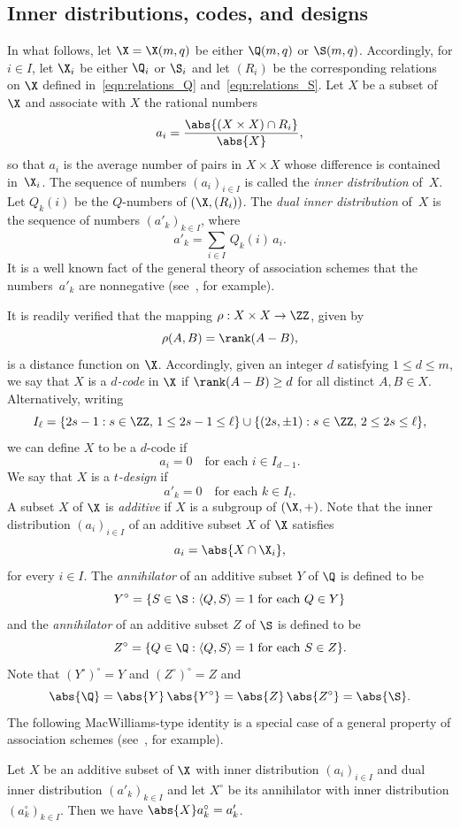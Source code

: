 \subsection{Inner distributions, codes, and designs}

In what follows, let $\X=\X(m,q)$ be either $\Q(m,q)$ or $\S(m,q)$. Accordingly, for $i\in I$, let $\X_i$ be either $\Q_i$ or $\S_i$  and let $(R_i)$ be the corresponding relations on $\X$ defined in~\eqref{eqn:relations_Q} and~\eqref{eqn:relations_S}. Let $X$ be a subset of $\X$ and associate with $X$ the rational numbers 
\[
a_i=\frac{\abs{(X\times X)\cap R_i}}{\abs{X}},
\]
so that $a_i$ is the average number of pairs in $X\times X$ whose difference is contained in~$\X_i$. The sequence of numbers $(a_i)_{i\in I}$ is called the \emph{inner distribution} of~$X$. Let $Q_k(i)$ be the $Q$-numbers of $(\X,(R_i))$. The \emph{dual inner distribution} of~$X$ is the sequence of numbers $(a'_k)_{k\in I}$, where
\begin{equation}
a'_k=\sum_{i\in I}\,Q_k(i)\,a_i.   \label{eqn:def_dual_distribution}
\end{equation}
It is a well known fact of the general theory of association schemes that the numbers~$a'_k$ are nonnegative (see~\cite[Theorem~3]{DelLev1998}, for example).
\par
It is readily verified that the mapping $\rho:X\times X\to\ZZ$, given by
\[
\rho(A,B)=\rank(A-B),
\]
is a distance function on $\X$. Accordingly, given an integer $d$ satisfying $1\le d\le m$, we say that $X$ is a \emph{$d$-code} in $\X$ if $\rank(A-B)\ge d$ for all distinct $A,B\in X$. Alternatively, writing
\[
I_\ell=\{2s-1:s\in\ZZ,\,1\le 2s-1\le \ell\}\cup\{(2s,\pm1):s\in\ZZ,\,2\le 2s\le \ell\},
\]
we can define $X$ to be a $d$-code if
\[
a_i=0\quad\text{for each $i\in I_{d-1}$}.
\]
We say that $X$ is a \emph{$t$-design} if
\[
a'_k=0\quad\text{for each $k\in I_t$}.
\]
A subset $X$ of $\X$ is \emph{additive} if $X$ is a subgroup of $(\X,+)$. Note that the inner distribution $(a_i)_{i\in I}$ of an additive subset $X$ of $\X$ satisfies
\[
a_i=\abs{X\cap \X_i},
\]
for every $i\in I$. The \emph{annihilator} of an additive subset $Y$ of $\Q$ is defined to be
\[
Y^\circ=\{S\in \S:\langle Q,S\rangle=1\;\text{for each $Q\in Y$}\}
\]
and the \emph{annihilator} of an additive subset $Z$ of $\S$ is defined to be
\[
Z^\circ=\{Q\in \Q:\langle Q,S\rangle=1\;\text{for each $S\in Z$}\}.
\]
Note that $(Y^\circ)^\circ=Y$ and $(Z^\circ)^\circ=Z$ and 
\[
\abs{\Q}=\abs{Y}\,\abs{Y^\circ}=\abs{Z}\,\abs{Z^\circ}=\abs{\S}.
\]
The following MacWilliams-type identity is a special case of a general property of association schemes (see~\cite[Theorem~27]{DelLev1998}, for example).
\begin{theorem}
\label{thm:dual}
Let $X$ be an additive subset of $\X$ with inner distribution $(a_i)_{i\in I}$ and dual inner distribution $(a'_k)_{k\in I}$ and let $X^\circ$ be its annihilator with inner distribution $(a^\circ_k)_{k\in I}$. Then we have $\abs{X}a^\circ_k=a'_k$.
\end{theorem}

